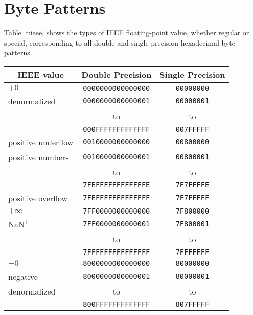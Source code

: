 \documentclass[11pt,makeidx]{book}     %
\begin{document}
\section{Byte Patterns}

 Table \ref{t:ieee} shows the types of IEEE floating-point value,
 whether regular or special, corresponding to all double and single
 precision hexadecimal byte patterns. 
 
\begin{table}[htpb]
\begin{center}
\begin{tabular}{lcc} \\
\multicolumn{1}{c}{IEEE value} & Double Precision 
                                              & Single Precision \\\hline
    $+0$                & {\tt 0000000000000000} & {\tt 00000000} \\
    denormalized        & {\tt 0000000000000001} & {\tt 00000001} \\
                        &             to         &         to     \\
                        & {\tt 000FFFFFFFFFFFFF} & {\tt 007FFFFF} \\
    positive underflow  & {\tt 0010000000000000} & {\tt 00800000} \\
    positive numbers    & {\tt 0010000000000001} & {\tt 00800001} \\
                        &             to         &         to     \\
                        & {\tt 7FEFFFFFFFFFFFFE} & {\tt 7F7FFFFE} \\
    positive overflow   & {\tt 7FEFFFFFFFFFFFFF} & {\tt 7F7FFFFF} \\
    $+\infty$           & {\tt 7FF0000000000000} & {\tt 7F800000} \\
    NaN$^{1}$           & {\tt 7FF0000000000001} & {\tt 7F800001} \\
                        &             to         &         to     \\
                        & {\tt 7FFFFFFFFFFFFFFF} & {\tt 7FFFFFFF} \\
    $-0$                & {\tt 8000000000000000} & {\tt 80000000} \\
    negative            & {\tt 8000000000000001} & {\tt 80000001} \\
     denormalized       &             to         &         to     \\
                        & {\tt 800FFFFFFFFFFFFF} & {\tt 807FFFFF} \\

\end{tabular}
\end{center}
\end{table}
\end{document}
